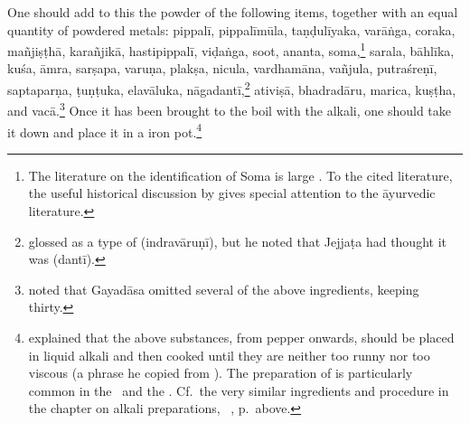 \begin{translation}
One should add to this the powder of the following items, together
with an equal quantity of powdered metals: \gls{pippalī},
\gls{pippalīmūla}, \gls{taṇḍulīyaka}, \gls{varāṅga}, \gls{coraka},
\gls{mañjiṣṭhā}, \gls{karañjikā}, \gls{hastipippalī}, \gls{viḍaṅga},
soot, \gls{ananta}, soma,\footnote{The literature on the identification of Soma is
    large \citep[passim]{wuja-2003}. To the cited literature, the useful
    historical discussion by \citet[449--455]{gvdb} gives special
    attention to the āyurvedic literature.} \gls{sarala}, \gls{bāhlīka},
    \gls{kuśa}, \gls{āmra}, \gls{sarṣapa}, \gls{varuṇa}, \gls{plakṣa},
    \gls{nicula}, \gls{vardhamāna}, \gls{vañjula}, \gls{putraśreṇī},
    \gls{saptaparṇa}, \gls{ṭuṇṭuka}, \gls{elavāluka},
    \gls{nāgadantī},\footnote{ glossed
         as a type of  (\gls{indravāruṇī}),
        but he noted that Jejjaṭa had thought it was 
        (\gls{dantī}).} \gls{ativiṣā}, \gls{bhadradāru}, \gls{marica},
        \gls{kuṣṭha}, and \gls{vacā}.\footnote{ noted
            that Gayadāsa omitted several of the above ingredients, keeping
            thirty.}  Once it has been brought to the boil with the alkali, one
            should take it down and place it in a iron
            pot.\footnote{\label{kṣārapāka2} explained that
                the above substances, from pepper onwards, should be placed in liquid
                alkali and then cooked until they are neither too runny nor too
                viscous (a phrase he copied from ).  The preparation
                of  is particularly common in the \SS\ and the \AH.  Cf.\
                the very similar ingredients and procedure in the chapter on alkali
                preparations, \SS\ \Su{1.11.11}{46--47}, p.\,\pageref{kṣārapāka}
                above.}
    
\end{translation}
